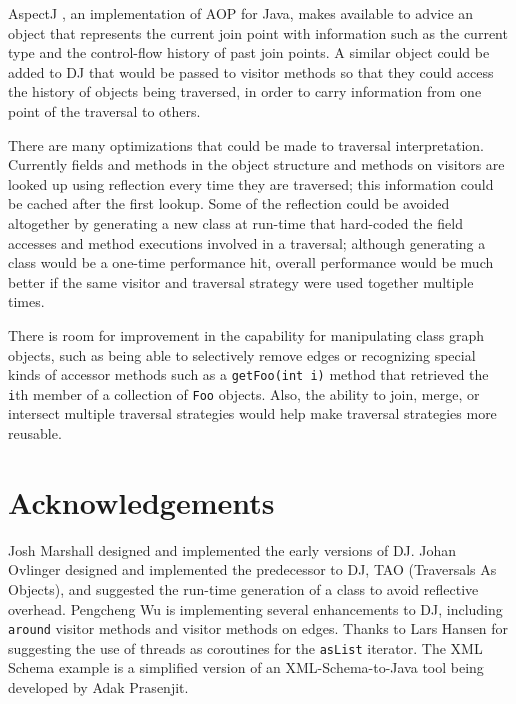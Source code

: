 \documentclass{llncs}
\newcommand{\code}[1]{\texttt{#1}}
\begin{document}
AspectJ \cite{aop:ecoop2001}, an implementation of AOP for Java, makes
available to advice an object that represents the current join point
with information such as the current type and the control-flow history
of past join points.  A similar object could be added to DJ that would
be passed to visitor methods so that they could access the history of
objects being traversed, in order to carry information from one point
of the traversal to others.

There are many optimizations that could be made to traversal
interpretation.  Currently fields and methods in the object structure
and methods on visitors are looked up using reflection every time they
are traversed; this information could be cached after the first
lookup.  Some of the reflection could be avoided altogether by
generating a new class at run-time that hard-coded the field accesses
and method executions involved in a traversal; although generating a
class would be a one-time performance hit, overall performance would
be much better if the same visitor and traversal strategy were used
together multiple times.

There is room for improvement in the capability for manipulating class
graph objects, such as being able to selectively remove edges or
recognizing special kinds of accessor methods such as a
\code{getFoo(int~i)} method that retrieved the \code{i}th member of a
collection of \code{Foo} objects.  Also, the ability to join, merge,
or intersect multiple traversal strategies would help make traversal
strategies more reusable.

\section{Acknowledgements}

Josh Marshall designed and implemented the early versions of DJ.
Johan Ovlinger designed and implemented the predecessor to DJ, TAO
(Traversals As Objects), and suggested the run-time generation of a
class to avoid reflective overhead.  Pengcheng Wu is implementing
several enhancements to DJ, including \code{around} visitor methods
and visitor methods on edges.  Thanks to Lars Hansen for
suggesting the use of threads as coroutines for the \code{asList}
iterator.  The XML Schema example is a simplified version of an
XML-Schema-to-Java tool being developed by Adak Prasenjit.



\end{document}
